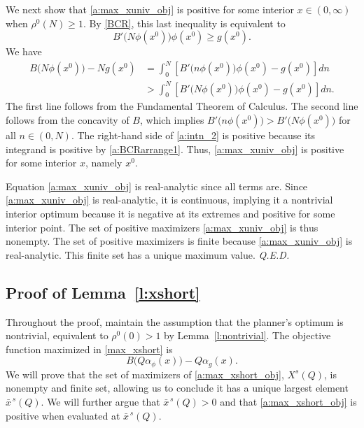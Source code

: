 \documentclass[12pt]{article}
\renewcommand{\qed}{{\it Q.E.D.}}
\newcommand{\efficacy}{\phi}
\newcommand{\general}{g}
\newcommand{\benefit}{B}
\newcommand{\ratio}{\rho^0\!}
\newcommand{\Xshort}{X^{s}}
\newcommand{\xshortbar}{\bar{x}^{\,s}}
\newcommand{\xno}{x^{0}}
\newcommand{\perunit}[1]{\alpha_{#1}}
\begin{document}
We next show that \eqref{a:max_xuniv_obj} is positive for some
interior $x \in (0, \infty)$ when $\ratio(N) \geq 1$. By \eqref{BCR},
this last inequality is equivalent to
\begin{equation}
\label{a:BCRarrange1}
\benefit' \! \bigl( N \efficacy(\xno) \bigr) \efficacy(\xno) \geq g(\xno).
\end{equation}
We have
\begin{align}
\benefit \bigl( N \efficacy(\xno) \bigr) - N g(\xno) & = \int_0^N \left[ \benefit' \! \bigl( n \efficacy(\xno) \bigr) \efficacy(\xno) - g(\xno) \right] dn \label{a:intn_1} \\
& >  \int_0^N \left[ \benefit'\! \bigl( N \efficacy(\xno) \bigr) \efficacy(\xno) - g(\xno) \right] dn. \label{a:intn_2} 
\end{align}
The first line follows from the Fundamental Theorem of Calculus. The
second line follows from the concavity of $\benefit$, which implies
$\benefit' \! \bigl( n \efficacy(\xno) \bigr) > \benefit' \! \bigl( N
\efficacy(\xno) \bigr)$ for all $n \in (0, N)$. The right-hand side of
\eqref{a:intn_2} is positive because its integrand is positive by
\eqref{a:BCRarrange1}. Thus, \eqref{a:max_xuniv_obj} is positive for
some interior $x$, namely $\xno$.

Equation \eqref{a:max_xuniv_obj} is real-analytic since all terms
are. Since \eqref{a:max_xuniv_obj} is real-analytic, it is continuous,
implying it a nontrivial interior optimum because it is negative at
its extremes and positive for some interior point. The set of positive
maximizers \eqref{a:max_xuniv_obj} is thus nonempty. The set of
positive maximizers is finite because \eqref{a:max_xuniv_obj} is
real-analytic. This finite set has a unique maximum value. \qed


\subsection*{Proof of Lemma~\ref{l:xshort}}

Throughout the proof, maintain the assumption that the planner's
optimum is nontrivial, equivalent to $\ratio(0) > 1$ by
Lemma~\ref{l:nontrivial}.  The objective function maximized in
\eqref{max_xshort} is
\begin{equation}
\label{a:max_xshort_obj}
\benefit \bigl( Q\perunit{\efficacy}\!(x) \bigr) - Q
\perunit{\general}\!(x).
\end{equation}
We will prove that the set of maximizers of \eqref{a:max_xshort_obj},
$\Xshort\!(Q)$, is nonempty and finite set, allowing us to conclude it
has a unique largest element $\xshortbar\!(Q)$. We will further argue
that $\xshortbar\!(Q) > 0$ and that \eqref{a:max_xshort_obj} is
positive when evaluated at $\xshortbar\!(Q)$.
\end{document}
